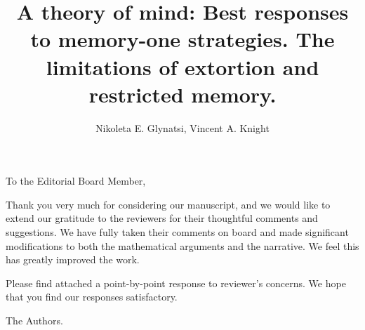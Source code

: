 \documentclass{article}
\title{A theory of mind: Best responses to memory-one strategies. The limitations
of extortion and restricted memory.}
\author{Nikoleta E. Glynatsi, Vincent A. Knight}
\begin{document}
\maketitle

To the Editorial Board Member,

Thank you very much for considering our manuscript, and we would like to extend
our gratitude to the reviewers for their thoughtful comments and suggestions. We
have fully taken their comments on board and made significant modifications to
both the mathematical arguments and the narrative. We feel this has greatly
improved the work.

Please find attached a point-by-point response to reviewer's concerns. We hope
that you find our responses satisfactory.

The Authors.
\end{document}
